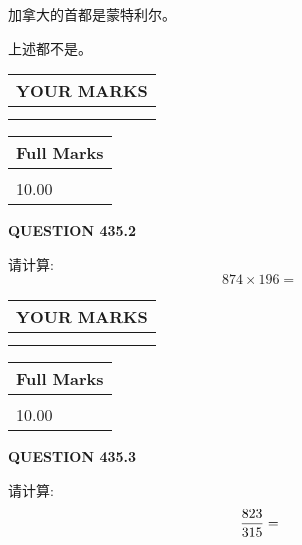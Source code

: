 \documentclass{ctexart}
\begin{document}
 
加拿大的首都是蒙特利尔。
 
 
 上述都不是。
 
 
  
\vspace{0.2in}
  
\noindent\begin{tabular}{|l|}
\hline
 YOUR MARKS  \\
\hline
 \\ 
 \\ 
\hline
\end{tabular}
\hspace{0.05in} \begin{tabular}{|l|}
\hline
 Full Marks  \\
\hline
 \\ 
10.00 \\
\hline
\end{tabular}
{\textbf{\Large{QUESTION
435.2 
}}}
  
  
 
请计算:
\begin{equation}
874  \times    %
196 = \nonumber
\end{equation}
 

 

 
  
\vspace{0.2in}
  
\noindent\begin{tabular}{|l|}
\hline
 YOUR MARKS  \\
\hline
 \\ 
 \\ 
\hline
\end{tabular}
\hspace{0.05in} \begin{tabular}{|l|}
\hline
 Full Marks  \\
\hline
 \\ 
10.00 \\
\hline
\end{tabular}
{\textbf{\Large{QUESTION
435.3 
}}}
  
  
 
请计算:
\begin{equation}
\frac { %
823 }  {  %
315} = \nonumber
\end{equation}
 

 

 
  
\vspace{0.2in}
  
\end{document}
